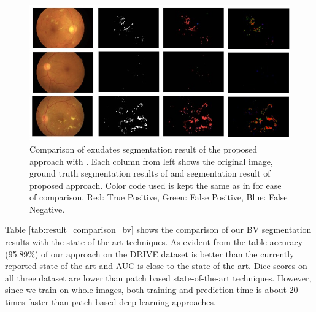 \documentclass[utf8]{FrontiersinHarvard} %
\begin{document}
\begin{figure}[ht!]
\begin{center}
\includegraphics[width=15cm]{images/exudates_comparison.jpg} %
\end{center}
\caption{Comparison of exudates segmentation result of the proposed approach with \cite{guo2020bin}. Each column from left shows the original image, ground truth segmentation results of \cite{guo2020bin} and segmentation result of proposed approach. Color code used is kept the same as in \cite{guo2020bin} for ease of comparison. Red: True Positive, Green: False Positive, Blue: False Negative.}
\label{fig:exudates_comparison}
\end{figure}


Table \ref{tab:result_comparison_bv} shows the comparison of our BV segmentation results with the state-of-the-art techniques. As evident from the table accuracy (95.89\%) of our approach on the DRIVE dataset is better than the currently reported state-of-the-art and AUC is close to the state-of-the-art. Dice scores on all three dataset are lower than patch based state-of-the-art techniques. However, since we train on whole images, both training and prediction time is about 20 times faster than patch based deep learning approaches.
\end{document}
